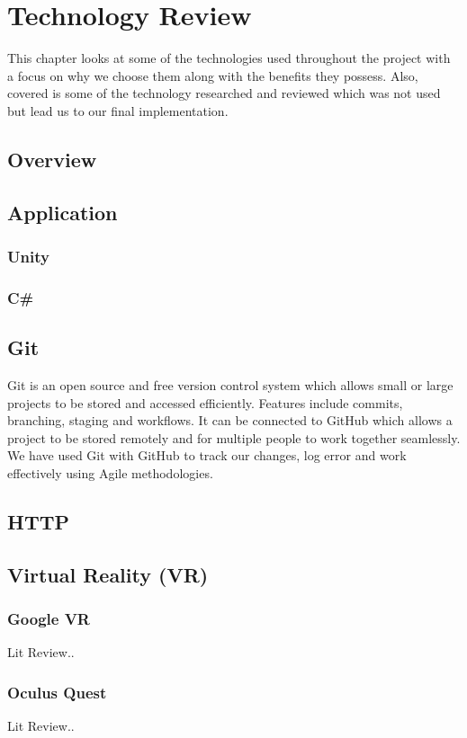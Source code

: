 \chapter{Technology Review}
This chapter looks at some of the technologies used throughout the project with a focus on why we choose them along with the benefits they possess. Also, covered is some of the technology researched and reviewed which was not used but lead us to our final implementation.

\section{Overview}

\section{Application}
\subsection{Unity}
\subsection{C\#}

\section{Git}
Git is an open source and free version control system which allows small or large projects to be stored and accessed efficiently. Features include commits, branching, staging and workflows. It can be connected to GitHub which allows a project to be stored remotely and for multiple people to work together seamlessly. We have used Git with GitHub to track our changes, log error and work effectively using Agile methodologies.

\section{HTTP}

\section{Virtual Reality (VR)}
\subsection{Google VR}
Lit Review..
\subsection{Oculus Quest}
Lit Review..

